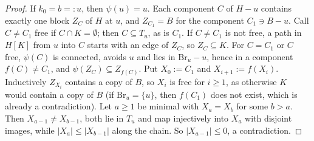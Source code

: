\documentclass[11pt]{article}
\theoremstyle{remark}
\newcommand{\abs}[1]{\lvert #1\rvert}
\begin{document}
\begin{proof}
If $k_0=b=:u$, then $\psi(u)=u$. Each component $C$ of $H-u$ contains exactly one block $Z_C$ of $H$ at $u$, and $Z_{C_1}=B$ for the component $C_1\ni B-u$. Call $C\ne C_1$ free if $C\cap K=\emptyset$; then $C\subseteq T_u$, as is $C_1$. If $C\ne C_1$ is not free, a path in $H[K]$ from $u$ into $C$ starts with an edge of $Z_C$, so $Z_C\subseteq K$. For $C=C_1$ or $C$ free, $\psi(C)$ is connected, avoids $u$ and lies in $\mathrm{Br}_u-u$, hence in a component $f(C)\ne C_1$, and $\psi(Z_C)\subseteq Z_{f(C)}$. Put $X_0:=C_1$ and $X_{i+1}:=f(X_i)$. Inductively $Z_{X_i}$ contains a copy of $B$, so $X_{i}$ is free for $i\ge1$, as otherwise $K$ would contain a copy of $B$ (if $\mathrm{Br}_u=\{u\}$, then $f(C_1)$ does not exist, which is already a contradiction). Let $a\ge1$ be minimal with $X_a=X_b$ for some $b>a$. Then $X_{a-1}\ne X_{b-1}$, both lie in $T_u$ and map injectively into $X_a$ with disjoint images, while $\abs{X_a}\le\abs{X_{b-1}}$ along the chain. So $\abs{X_{a-1}}\le0$, a contradiction.
\end{proof}
\end{document}
